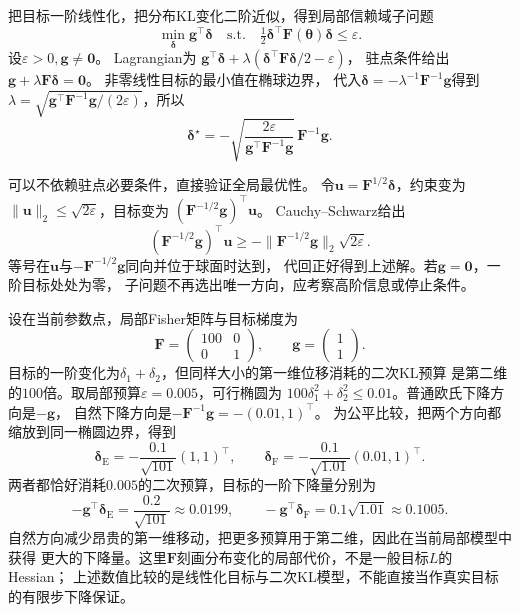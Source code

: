 把目标一阶线性化，把分布KL变化二阶近似，得到局部信赖域子问题
\begin{equation}
  \min_{\bm\delta}\bm g^\top\bm\delta
  \quad\text{s.t.}\quad
  \tfrac12\bm\delta^\top\bm F(\bm\theta)\bm\delta\leq\varepsilon.
  \label{eq:information-natural-gradient-trust-region}
\end{equation}
设\(\varepsilon>0,\bm g\neq\bm0\)。
Lagrangian为
\(\bm g^\top\bm\delta+\lambda(\bm\delta^\top\bm F\bm\delta/2-\varepsilon)\)，
驻点条件给出
\(\bm g+\lambda\bm F\bm\delta=\bm0\)。
非零线性目标的最小值在椭球边界，
代入\(\bm\delta=-\lambda^{-1}\bm F^{-1}\bm g\)得到
\(\lambda=\sqrt{\bm g^\top\bm F^{-1}\bm g/(2\varepsilon)}\)，所以
\begin{equation}
  \bm\delta^\star
  =-\sqrt{\frac{2\varepsilon}{\bm g^\top\bm F^{-1}\bm g}}\,
    \bm F^{-1}\bm g.
  \label{eq:information-natural-gradient-step}
\end{equation}

可以不依赖驻点必要条件，直接验证全局最优性。
令\(\bm u=\bm F^{1/2}\bm\delta\)，约束变为
\(\|\bm u\|_2\leq\sqrt{2\varepsilon}\)，目标变为
\((\bm F^{-1/2}\bm g)^\top\bm u\)。
Cauchy--Schwarz给出
\[
  (\bm F^{-1/2}\bm g)^\top\bm u
  \geq-\|\bm F^{-1/2}\bm g\|_2\sqrt{2\varepsilon}.
\]
等号在\(\bm u\)与\(-\bm F^{-1/2}\bm g\)同向并位于球面时达到，
代回正好得到上述解。若\(\bm g=\bm0\)，一阶目标处处为零，
子问题不再选出唯一方向，应考察高阶信息或停止条件。

\begin{example}[同一分布变化预算下的两个下降方向]
\label{ex:information-natural-gradient-ellipse}
设在当前参数点，局部Fisher矩阵与目标梯度为
\[
 \bm F=\begin{pmatrix}100&0\\0&1\end{pmatrix},
 \qquad \bm g=\begin{pmatrix}1\\1\end{pmatrix}.
\]
目标的一阶变化为\(\delta_1+\delta_2\)，但同样大小的第一维位移消耗的二次KL预算
是第二维的\(100\)倍。取局部预算\(\varepsilon=0.005\)，可行椭圆为
\(100\delta_1^2+\delta_2^2\leq0.01\)。普通欧氏下降方向是\(-\bm g\)，
自然下降方向是\(-\bm F^{-1}\bm g=-(0.01,1)^\top\)。
为公平比较，把两个方向都缩放到同一椭圆边界，得到
\[
 \bm\delta_{\mathrm E}=-\frac{0.1}{\sqrt{101}}(1,1)^\top,
 \qquad
 \bm\delta_{\mathrm F}=-\frac{0.1}{\sqrt{1.01}}(0.01,1)^\top.
\]
两者都恰好消耗\(0.005\)的二次预算，目标的一阶下降量分别为
\[
 -\bm g^\top\bm\delta_{\mathrm E}
 =\frac{0.2}{\sqrt{101}}\approx0.0199,
 \qquad
 -\bm g^\top\bm\delta_{\mathrm F}
 =0.1\sqrt{1.01}\approx0.1005.
\]
自然方向减少昂贵的第一维移动，把更多预算用于第二维，因此在当前局部模型中获得
更大的下降量。这里\(\bm F\)刻画分布变化的局部代价，不是一般目标\(L\)的Hessian；
上述数值比较的是线性化目标与二次KL模型，不能直接当作真实目标的有限步下降保证。
\end{example}

